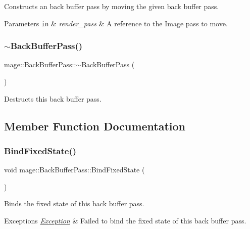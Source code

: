 Constructs an back buffer pass by moving the given back buffer pass.


\begin{DoxyParams}[1]{Parameters}
\mbox{\tt in}  & {\em render\+\_\+pass} & A reference to the Image pass to move. \\
\hline
\end{DoxyParams}
\hypertarget{classmage_1_1_back_buffer_pass_a10ccd92ff4480261e9ecfc435f5d9ed3}{}\label{classmage_1_1_back_buffer_pass_a10ccd92ff4480261e9ecfc435f5d9ed3} 
\subsubsection{\texorpdfstring{$\sim$\+Back\+Buffer\+Pass()}{~BackBufferPass()}}
{\footnotesize\ttfamily mage\+::\+Back\+Buffer\+Pass\+::$\sim$\+Back\+Buffer\+Pass (\begin{DoxyParamCaption}{ }\end{DoxyParamCaption})\hspace{0.3cm}{\ttfamily [default]}}

Destructs this back buffer pass. 

\subsection{Member Function Documentation}
\hypertarget{classmage_1_1_back_buffer_pass_a86dd8df1ac3fac070d1373dad045c975}{}\label{classmage_1_1_back_buffer_pass_a86dd8df1ac3fac070d1373dad045c975} 
\subsubsection{\texorpdfstring{Bind\+Fixed\+State()}{BindFixedState()}}
{\footnotesize\ttfamily void mage\+::\+Back\+Buffer\+Pass\+::\+Bind\+Fixed\+State (\begin{DoxyParamCaption}{ }\end{DoxyParamCaption})}

Binds the fixed state of this back buffer pass.


\begin{DoxyExceptions}{Exceptions}
{\em \hyperlink{classmage_1_1_exception}{Exception}} & Failed to bind the fixed state of this back buffer pass. \\
\hline
\end{DoxyExceptions}
\hypertarget{classmage_1_1_back_buffer_pass_ae925b441c80f2aa711fbba6d782e5f81}{}\label{classmage_1_1_back_buffer_pass_ae925b441c80f2aa711fbba6d782e5f81} 
